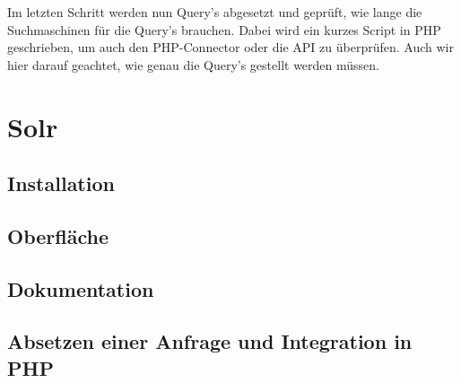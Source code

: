 Im letzten Schritt werden nun Query’s abgesetzt und geprüft, wie lange die Suchmaschinen für die Query’s brauchen. Dabei wird ein kurzes Script in PHP geschrieben, um auch den PHP-Connector oder die API zu überprüfen. Auch wir hier darauf geachtet, wie genau die Query’s gestellt werden müssen.

\section{Solr}

\subsection{Installation}

\subsection{Oberfläche}

\subsection{Dokumentation}

\subsection{Absetzen einer Anfrage und Integration in PHP}